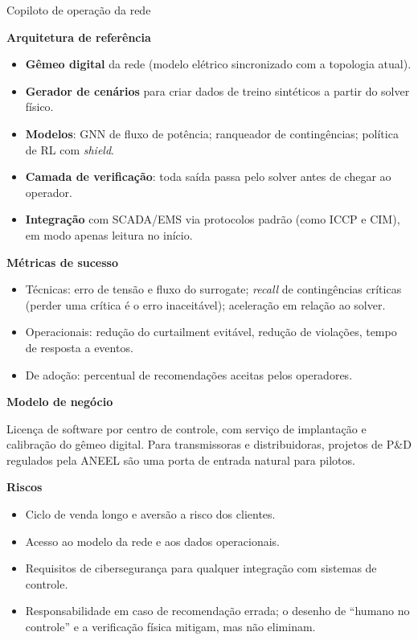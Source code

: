 \documentclass[11pt,a4paper]{article}
\newcommand{\prodsec}[1]{\par\medskip\noindent\textbf{\color{prodcolor}#1}\par\smallskip}
\begin{document}
\begin{produto}{Copiloto de operação da rede}
\prodsec{Arquitetura de referência}
\begin{itemize}
  \item \textbf{Gêmeo digital} da rede (modelo elétrico sincronizado com a
    topologia atual).
  \item \textbf{Gerador de cenários} para criar dados de treino sintéticos a
    partir do solver físico.
  \item \textbf{Modelos}: GNN de fluxo de potência; ranqueador de
    contingências; política de RL com \textit{shield}.
  \item \textbf{Camada de verificação}: toda saída passa pelo solver antes de
    chegar ao operador.
  \item \textbf{Integração} com SCADA/EMS via protocolos padrão (como ICCP e
    CIM), em modo apenas leitura no início.
\end{itemize}

\prodsec{Métricas de sucesso}
\begin{itemize}
  \item Técnicas: erro de tensão e fluxo do surrogate; \textit{recall} de
    contingências críticas (perder uma crítica é o erro inaceitável);
    aceleração em relação ao solver.
  \item Operacionais: redução do curtailment evitável, redução de violações,
    tempo de resposta a eventos.
  \item De adoção: percentual de recomendações aceitas pelos operadores.
\end{itemize}

\prodsec{Modelo de negócio}
Licença de software por centro de controle, com serviço de implantação e
calibração do gêmeo digital. Para transmissoras e distribuidoras, projetos de
P\&D regulados pela ANEEL são uma porta de entrada natural para pilotos.

\prodsec{Riscos}
\begin{itemize}
  \item Ciclo de venda longo e aversão a risco dos clientes.
  \item Acesso ao modelo da rede e aos dados operacionais.
  \item Requisitos de cibersegurança para qualquer integração com sistemas de
    controle.
  \item Responsabilidade em caso de recomendação errada; o desenho de
    ``humano no controle'' e a verificação física mitigam, mas não eliminam.
\end{itemize}
\end{produto}
\end{document}
